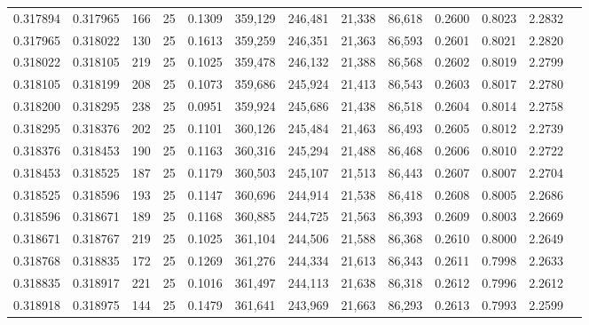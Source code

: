 \begin{tabular}{rrrrrrrrrrrrr}
0.317894 & 0.317965 &   166 &  25 &                                     0.1309 & 359,129 & 246,481 &  21,338 &  86,618 & 0.2600 & 0.8023 & 2.2832 \\
0.317965 & 0.318022 &   130 &  25 &                                     0.1613 & 359,259 & 246,351 &  21,363 &  86,593 & 0.2601 & 0.8021 & 2.2820 \\
0.318022 & 0.318105 &   219 &  25 &                                     0.1025 & 359,478 & 246,132 &  21,388 &  86,568 & 0.2602 & 0.8019 & 2.2799 \\
0.318105 & 0.318199 &   208 &  25 &                                     0.1073 & 359,686 & 245,924 &  21,413 &  86,543 & 0.2603 & 0.8017 & 2.2780 \\
0.318200 & 0.318295 &   238 &  25 &                                     0.0951 & 359,924 & 245,686 &  21,438 &  86,518 & 0.2604 & 0.8014 & 2.2758 \\
0.318295 & 0.318376 &   202 &  25 &                                     0.1101 & 360,126 & 245,484 &  21,463 &  86,493 & 0.2605 & 0.8012 & 2.2739 \\
0.318376 & 0.318453 &   190 &  25 &                                     0.1163 & 360,316 & 245,294 &  21,488 &  86,468 & 0.2606 & 0.8010 & 2.2722 \\
0.318453 & 0.318525 &   187 &  25 &                                     0.1179 & 360,503 & 245,107 &  21,513 &  86,443 & 0.2607 & 0.8007 & 2.2704 \\
0.318525 & 0.318596 &   193 &  25 &                                     0.1147 & 360,696 & 244,914 &  21,538 &  86,418 & 0.2608 & 0.8005 & 2.2686 \\
0.318596 & 0.318671 &   189 &  25 &                                     0.1168 & 360,885 & 244,725 &  21,563 &  86,393 & 0.2609 & 0.8003 & 2.2669 \\
0.318671 & 0.318767 &   219 &  25 &                                     0.1025 & 361,104 & 244,506 &  21,588 &  86,368 & 0.2610 & 0.8000 & 2.2649 \\
0.318768 & 0.318835 &   172 &  25 &                                     0.1269 & 361,276 & 244,334 &  21,613 &  86,343 & 0.2611 & 0.7998 & 2.2633 \\
0.318835 & 0.318917 &   221 &  25 &                                     0.1016 & 361,497 & 244,113 &  21,638 &  86,318 & 0.2612 & 0.7996 & 2.2612 \\
0.318918 & 0.318975 &   144 &  25 &                                     0.1479 & 361,641 & 243,969 &  21,663 &  86,293 & 0.2613 & 0.7993 & 2.2599 \\

\end{tabular}
